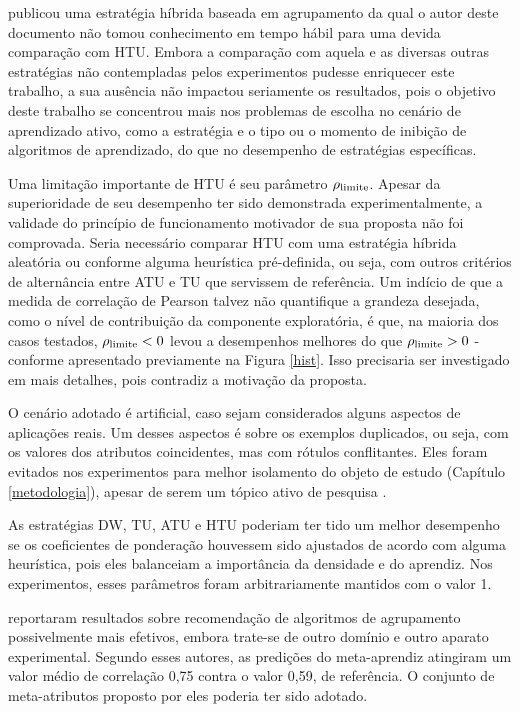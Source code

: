  publicou uma estratégia híbrida baseada em agrupamento da qual o autor deste documento não tomou conhecimento em tempo hábil para uma devida comparação com HTU.
Embora a comparação com aquela e as diversas outras estratégias não contempladas pelos experimentos pudesse enriquecer este trabalho, a sua ausência não impactou seriamente os resultados, pois o objetivo deste trabalho se concentrou mais nos problemas de escolha no cenário de aprendizado ativo, como a estratégia e o tipo ou o momento de inibição de algoritmos de aprendizado, do que no desempenho de estratégias específicas.

Uma limitação importante de HTU é seu parâmetro $\rho_{\operatorname*{limite}}$.
Apesar da superioridade de seu desempenho ter sido demonstrada experimentalmente,
a validade do princípio de funcionamento motivador de sua proposta não foi comprovada.
Seria necessário comparar HTU com uma estratégia híbrida aleatória ou conforme alguma heurística pré-definida, ou seja, com outros critérios de alternância entre ATU e TU que servissem de referência.
Um indício de que a medida de correlação de Pearson talvez não quantifique a grandeza desejada, como o nível de contribuição da componente exploratória, é que, na maioria dos casos testados, $\rho_{\operatorname*{limite}}<0$ levou a desempenhos melhores do que $\rho_{\operatorname*{limite}}>0$  - conforme apresentado previamente na Figura \ref{hist}.
Isso precisaria ser investigado em mais detalhes, pois contradiz a motivação da proposta.

O cenário adotado é artificial, caso sejam considerados alguns aspectos de aplicações reais.
Um desses aspectos é sobre os exemplos duplicados, ou seja, com os valores dos atributos coincidentes, mas com rótulos conflitantes.
Eles foram evitados nos experimentos para melhor isolamento do objeto de estudo (Capítulo \ref{metodologia}), apesar de serem um tópico ativo de pesquisa \cite{journals/datamine/IpeirotisPSW14,conf/kdd/ShengPI08}.

As estratégias DW, TU, ATU e HTU poderiam ter tido um melhor desempenho se os coeficientes de ponderação houvessem sido ajustados de acordo com alguma heurística, pois eles balanceiam a importância da densidade e do aprendiz.
Nos experimentos, esses parâmetros foram arbitrariamente mantidos com o valor 1.

 reportaram resultados sobre recomendação de algoritmos de agrupamento possivelmente mais efetivos, embora trate-se de outro domínio e outro aparato experimental.
Segundo esses autores, as predições do meta-aprendiz atingiram um valor médio de correlação 0,75 contra o valor 0,59, de referência.
O conjunto de meta-atributos proposto por eles poderia ter sido adotado.

